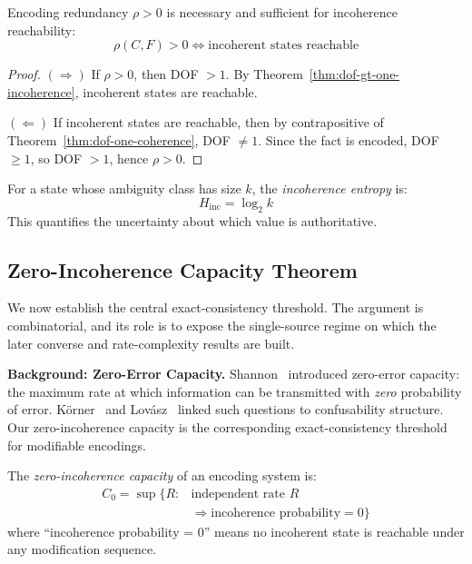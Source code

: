 \begin{theorem}\label{thm:redundancy-incoherence}
Encoding redundancy $\rho > 0$ is necessary and sufficient for incoherence reachability:
\[
\rho(C, F) > 0 \Longleftrightarrow \text{incoherent states reachable}
\]
\end{theorem}

\begin{proof}
$(\Rightarrow)$ If $\rho > 0$, then DOF $> 1$. By Theorem~\ref{thm:dof-gt-one-incoherence}, incoherent states are reachable.

$(\Leftarrow)$ If incoherent states are reachable, then by contrapositive of Theorem~\ref{thm:dof-one-coherence}, DOF $\neq 1$. Since the fact is encoded, DOF $\geq 1$, so DOF $> 1$, hence $\rho > 0$.
\end{proof}

\begin{definition}\label{def:incoherence-entropy}
For a state whose ambiguity class has size $k$, the \emph{incoherence entropy} is:
\[
H_{\text{inc}} = \log_2 k
\]
This quantifies the uncertainty about which value is authoritative.
\end{definition}

\subsection{Zero-Incoherence Capacity Theorem}\label{sec:capacity}

We now establish the central exact-consistency threshold. The argument is combinatorial, and its role is to expose the single-source regime on which the later converse and rate-complexity results are built.

\textbf{Background: Zero-Error Capacity.} Shannon~\cite{shannon1956zero} introduced zero-error capacity: the maximum rate at which information can be transmitted with \emph{zero} probability of error. Körner~\cite{korner1973graphs} and Lovász~\cite{lovasz1979shannon} linked such questions to confusability structure. Our zero-incoherence capacity is the corresponding exact-consistency threshold for modifiable encodings.

\begin{definition}\label{def:coherence-capacity}
The \emph{zero-incoherence capacity} of an encoding system is:
\[
\begin{aligned}
C_0 = \sup\{R : {} & \text{independent rate } R \\
& \Rightarrow \text{incoherence probability} = 0\}
\end{aligned}
\]
where ``incoherence probability = 0'' means no incoherent state is reachable under any modification sequence.
\end{definition}

